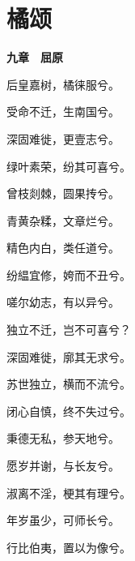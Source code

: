 \documentclass[12pt,a4paper]{ctexbook}
\begin{document}
\section{橘颂}
\textbf{九章　屈原}\par\vspace{0.5em}
后皇嘉树，橘徕服兮。\par
受命不迁，生南国兮。\par
深固难徙，更壹志兮。\par
绿叶素荣，纷其可喜兮。\par
曾枝剡棘，圆果抟兮。\par
青黄杂糅，文章烂兮。\par
精色内白，类任道兮。\par
纷緼宜修，姱而不丑兮。\par
嗟尔幼志，有以异兮。\par
独立不迁，岂不可喜兮？\par
深固难徙，廓其无求兮。\par
苏世独立，横而不流兮。\par
闭心自慎，终不失过兮。\par
秉德无私，参天地兮。\par
愿岁并谢，与长友兮。\par
淑离不淫，梗其有理兮。\par
年岁虽少，可师长兮。\par
行比伯夷，置以为像兮。\par
\end{document}
